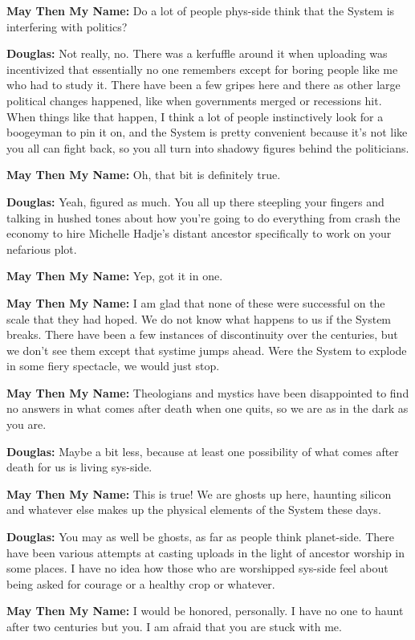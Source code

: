 \textbf{May Then My Name:} Do a lot of people phys-side think that the System is interfering with politics?

\textbf{Douglas:} Not really, no. There was a kerfuffle around it when uploading was incentivized that essentially no one remembers except for boring people like me who had to study it. There have been a few gripes here and there as other large political changes happened, like when governments merged or recessions hit. When things like that happen, I think a lot of people instinctively look for a boogeyman to pin it on, and the System is pretty convenient because it's not like you all can fight back, so you all turn into shadowy figures behind the politicians.

\textbf{May Then My Name:} Oh, that bit is definitely true.

\textbf{Douglas:} Yeah, figured as much. You all up there steepling your fingers and talking in hushed tones about how you're going to do everything from crash the economy to hire Michelle Hadje's distant ancestor specifically to work on your nefarious plot.

\textbf{May Then My Name:} Yep, got it in one.

\textbf{May Then My Name:} I am glad that none of these were successful on the scale that they had hoped. We do not know what happens to us if the System breaks. There have been a few instances of discontinuity over the centuries, but we don't see them except that systime jumps ahead. Were the System to explode in some fiery spectacle, we would just stop.

\textbf{May Then My Name:} Theologians and mystics have been disappointed to find no answers in what comes after death when one quits, so we are as in the dark as you are.

\textbf{Douglas:} Maybe a bit less, because at least one possibility of what comes after death for us is living sys-side.

\textbf{May Then My Name:} This is true! We are ghosts up here, haunting silicon and whatever else makes up the physical elements of the System these days.

\textbf{Douglas:} You may as well be ghosts, as far as people think planet-side. There have been various attempts at casting uploads in the light of ancestor worship in some places. I have no idea how those who are worshipped sys-side feel about being asked for courage or a healthy crop or whatever.

\textbf{May Then My Name:} I would be honored, personally. I have no one to haunt after two centuries but you. I am afraid that you are stuck with me.

